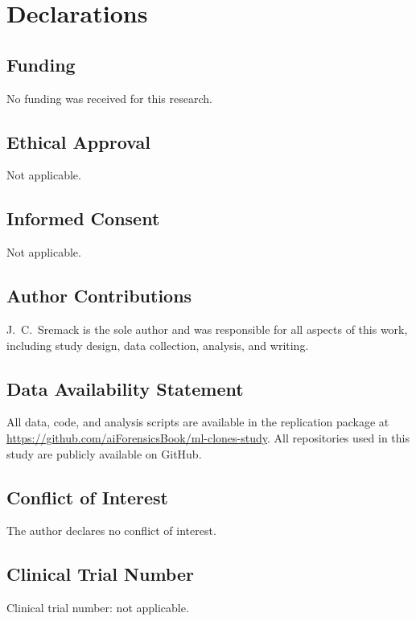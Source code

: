 \documentclass[smallextended,natbib]{svjour3}
\begin{document}
\section*{Declarations}

\subsection*{Funding}
No funding was received for this research.

\subsection*{Ethical Approval}
Not applicable.

\subsection*{Informed Consent}
Not applicable.

\subsection*{Author Contributions}
J.\ C.\ Sremack is the sole author and was responsible for all aspects of this work, including study design, data collection, analysis, and writing.

\subsection*{Data Availability Statement}
All data, code, and analysis scripts are available in the replication package at \url{https://github.com/aiForensicsBook/ml-clones-study}. All repositories used in this study are publicly available on GitHub.

\subsection*{Conflict of Interest}
The author declares no conflict of interest.

\subsection*{Clinical Trial Number}
Clinical trial number: not applicable.



\end{document}

